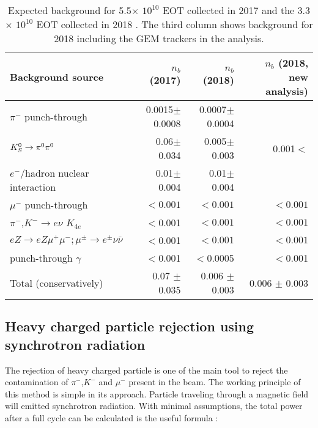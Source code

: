 \begin{table}[bth!]
  \centering
  \caption[Visible mode background]{Expected background for 5.5$\times$ $10^{10}$ EOT collected in 2017 \cite{Banerjee:2018vgk} and the 3.3$\times$ $10^{10}$ EOT collected in 2018 \cite{Banerjee:2019hmi}. The third column shows background for 2018 including the GEM trackers in the analysis.}
  \begin{tabular}{lrrr}
    \hline \hline
    Background source                           & $n_b$ (2017)      &  $n_b$ (2018)   & $n_b$ (2018, new analysis)\\
    \hline
    $\pi^-$ punch-through                        & 0.0015$\pm$0.0008 &  0.0007$\pm$0.0004      \\    
    $K^0_S \rightarrow \pi^0 \pi^0$                     & 0.06$\pm$0.034    & 0.005$\pm$0.003 &     0.001$<$\\
    $e^-$/hadron nuclear interaction  & 0.01$\pm$0.004    & 0.01$\pm$0.004  & \\    
    $\mu^-$ punch-through                        & $<0.001$ & $<0.001$ & $<0.001$       \\            
    $\pi^-$,$K^- \rightarrow e\nu$ $K_{4e}$              & $<$0.001 & $<0.001$ & $<0.001$\\
    $eZ \rightarrow e Z \mu^+\mu^-;\mu^{\pm}\rightarrow e^{\pm}\nu\bar{\nu}$ & $<$0.001 & $<0.001$ & $<0.001$\\
    punch-through $\gamma$ & $<$0.001 & $<$0.0005 & $<$0.001 \\
    \hline
    Total (conservatively)                      & 0.07 $\pm$ 0.035   & 0.006 $\pm$ 0.003  & 0.006 $\pm$ 0.003\\
    \hline \hline                       
  \end{tabular}
  \label{tab:vis-bkg}
\end{table}



\subsection{Heavy charged particle rejection using synchrotron radiation}
\label{ch3:sec:bkg-srd}

The rejection of heavy charged particle is one of the main tool to reject the contamination of $\pi^-$,$K^-$ and $\mu^-$ present in the beam. The working principle of this method is simple in its approach. Particle traveling through a magnetic field will emitted synchrotron radiation. With minimal assumptions, the total power after a full cycle can be calculated is the useful formula :


